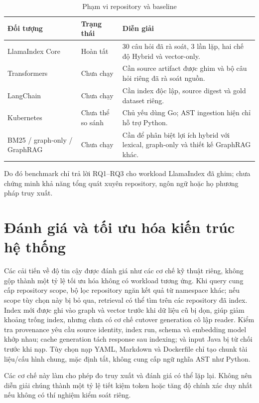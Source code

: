 \documentclass[12pt,a4paper,oneside]{report}
\begin{document}
\begin{table}[H]
    \centering
    \caption{Phạm vi repository và baseline}
    \label{tab:evaluation_coverage}
    \begin{tabular}{p{3.2cm}p{3.2cm}p{6.4cm}}
        \toprule
        \textbf{Đối tượng} & \textbf{Trạng thái} & \textbf{Diễn giải} \\
        \midrule
        LlamaIndex Core & Hoàn tất & 30 câu hỏi đã rà soát, 3 lần lặp, hai chế độ Hybrid và vector-only. \\
        Transformers & Chưa chạy & Cần source artifact được ghim và bộ câu hỏi riêng đã rà soát nguồn. \\
        LangChain & Chưa chạy & Cần index độc lập, source digest và gold dataset riêng. \\
        Kubernetes & Chưa thể so sánh & Chủ yếu dùng Go; AST ingestion hiện chỉ hỗ trợ Python. \\
        BM25 / graph-only / GraphRAG & Chưa chạy & Cần để phân biệt lợi ích hybrid với lexical, graph-only và thiết kế GraphRAG khác. \\
        \bottomrule
    \end{tabular}
\end{table}

Do đó benchmark chỉ trả lời RQ1--RQ3 cho workload LlamaIndex đã ghim; chưa chứng minh khả năng tổng quát xuyên repository, ngôn ngữ hoặc họ phương pháp truy xuất.

\section{Đánh giá và tối ưu hóa kiến trúc hệ thống}
Các cải tiến về độ tin cậy được đánh giá như các cơ chế kỹ thuật riêng, không gộp thành một tỷ lệ tối ưu hóa không có workload tương ứng. Khi query cung cấp repository scope, bộ lọc repository ngăn kết quả từ namespace khác; nếu scope tùy chọn này bị bỏ qua, retrieval có thể tìm trên các repository đã index. Index mới được ghi vào graph và vector trước khi dữ liệu cũ bị dọn, giúp giảm khoảng trống index, nhưng chưa có cơ chế cutover generation cô lập reader. Kiểm tra provenance yêu cầu source identity, index run, schema và embedding model khớp nhau; cache generation tách response sau indexing; và input Java bị từ chối trước khi nạp. Tùy chọn nạp YAML, Markdown và Dockerfile chỉ tạo chunk tài liệu/cấu hình chung, mặc định tắt, không cung cấp ngữ nghĩa AST như Python.

Các cơ chế này làm cho phép đo truy xuất và đánh giá có thể lặp lại. Không nên diễn giải chúng thành một tỷ lệ tiết kiệm token hoặc tăng độ chính xác duy nhất nếu không có thí nghiệm kiểm soát riêng.
\end{document}
